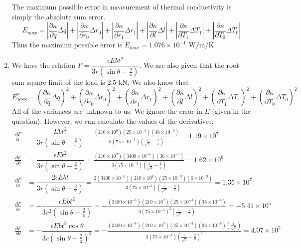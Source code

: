 \documentclass[a4paper, 11pt]{article}
\let\e\epsilon
\begin{document}
\begin{enumerate}[label=(\arabic*),leftmargin=*]
The maximum possible error in measurement of thermal conductivity is simply the absolute sum error.
$$E_{max}=\left|\frac{\partial\kappa}{\partial q}\Delta{q}\right|+\left|\frac{\partial\kappa}{\partial r_0}\Delta{r_0}\right|+\left|\frac{\partial\kappa}{\partial r_1}\Delta{r_1}\right|+\left|\frac{\partial\kappa}{\partial l}\Delta{l}\right|+\left|\frac{\partial\kappa}{\partial T_1}\Delta{T_1}\right|+\left|\frac{\partial\kappa}{\partial T_0}\Delta{T_0}\right|$$
Thus the maximum possible error is $\boxed{E_{max}=1.076\times 10^{-1}\text{ W/m/K}}$.
\newpage
 	\item We have the relation $F=\dfrac{\e Ebt^2}{3r(\sin\theta-\frac{2}{\pi})}$. We are also given that the root sum square limit of the load is 2.5 kN. We also know that 
 	$$E_{RSS}^2=\left(\frac{\partial\kappa}{\partial q}\Delta q\right)^2+\left(\frac{\partial\kappa}{\partial r_0}\Delta r_0\right)^2+\left(\frac{\partial\kappa}{\partial r_1}\Delta r_1\right)^2+\left(\frac{\partial\kappa}{\partial l}\Delta l\right)^2+\left(\frac{\partial\kappa}{\partial T_1}\Delta T_1\right)^2+\left(\frac{\partial\kappa}{\partial T_0}\Delta T_0\right)^2$$
All of the variances are unknown to us. We ignore the error in $E$ (given in the question). However, we can calculate the values of the derivatives:
\begin{align*}
	\frac{\partial F}{\partial\e}&=\dfrac{ Ebt^2}{3r(\sin\theta-\frac{2}{\pi})}=\frac{(210\times 10^9)(25\times 10^{-3})(36\times 10^{-6})}{3(75\times 10^{-3})(\frac{1}{\sqrt{2}}-\frac{2}{\pi})}=1.19\times 10^7\\
	\frac{\partial F}{\partial b}&=\dfrac{\e Et^2}{3r(\sin\theta-\frac{2}{\pi})}=\frac{(210\times 10^9)(3400\times 10^{-6})(36\times 10^{-6})}{3(75\times 10^{-3})(\frac{1}{\sqrt{2}}-\frac{2}{\pi})}=1.62\times 10^6\\
	\frac{\partial F}{\partial t}&=\dfrac{2\e Ebt}{3r(\sin\theta-\frac{2}{\pi})}=\frac{2(3400\times 10^{-6})(210\times 10^9)(25\times 10^{-3})(6\times 10^{-3})}{3(75\times 10^{-3})(\frac{1}{\sqrt{2}}-\frac{2}{\pi})}=1.35\times 10^7\\
	\frac{\partial F}{\partial r}&=-\dfrac{\e Ebt^2}{3r^2(\sin\theta-\frac{2}{\pi})}=-\frac{(3400\times 10^{-6})(210\times 10^9)(25\times 10^{-3})(36\times 10^{-6})}{3(75\times 10^{-3})^2(\frac{1}{\sqrt{2}}-\frac{2}{\pi})}=-5.41\times 10^5\\
	\frac{\partial F}{\partial\theta}&=-\dfrac{\e Ebt^2\cos\theta}{3r(\sin\theta-\frac{2}{\pi})^2}=-\frac{(3400\times 10^{-6})(210\times 10^9)(25\times 10^{-3})(36\times 10^{-6})(\frac{1}{\sqrt{2}})}{3(75\times 10^{-3})(\frac{1}{\sqrt{2}}-\frac{2}{\pi})^2}=4.07\times 10^5

\end{align*}
\end{enumerate}
\end{document}
